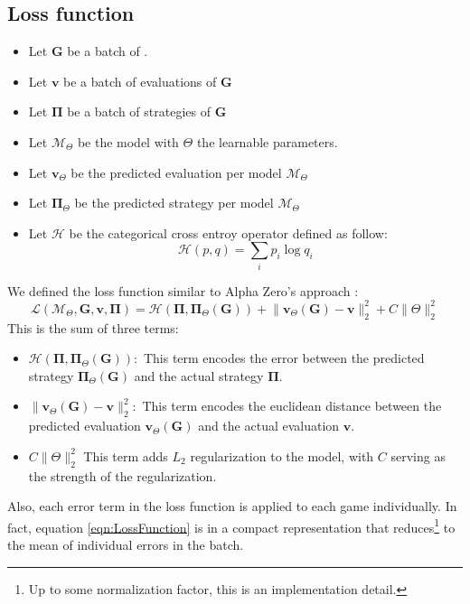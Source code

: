 \subsection{Loss function}
\begin{itemize}
	\item Let $\boldsymbol{G}$ be a batch of .
	\item Let $\boldsymbol{v}$ be a batch of evaluations of $\boldsymbol{G}$ 
	\item Let $\boldsymbol{\Pi}$ be a batch of strategies of $\boldsymbol{G}$
	\item Let $\mathcal{M}_{\Theta}$ be the model with $\Theta$ the learnable parameters.
	\item Let $\boldsymbol{v}_{\Theta}$ be the predicted evaluation per model $\mathcal{M}_{\Theta}$
	\item Let $\boldsymbol{\Pi}_{\Theta}$ be the predicted strategy per model $\mathcal{M}_{\Theta}$ 
	\item Let $\mathcal{H}$ be the categorical cross entroy operator defined as follow:
	\begin{equation*}
		\mathcal{H}(p,q) = \sum_{i}p_i \log q_i 
	\end{equation*}
\end{itemize}
We defined the loss function similar to Alpha Zero's approach \cite{AlphaZero}:
\begin{equation}
	\label{eqn:LossFunction}
	\mathcal{L}(\mathcal{M}_{\Theta},\boldsymbol{G},\boldsymbol{v},\boldsymbol{\Pi}) = \mathcal{H}(\boldsymbol{\Pi},\boldsymbol{\Pi}_\Theta(\boldsymbol{G})) + \lVert \boldsymbol{v}_{\Theta}(\boldsymbol{G})- \boldsymbol{v} \rVert_2^2 +  C \lVert \Theta \rVert_2^2
\end{equation}
This is the sum of three terms:
\begin{itemize}
	\item $\displaystyle \mathcal{H}(\boldsymbol{\Pi},\boldsymbol{\Pi}_\Theta(\boldsymbol{G})):$ This term encodes the error between the predicted strategy $\boldsymbol{\Pi}_\Theta(\boldsymbol{G})$ and the actual strategy $\boldsymbol{\Pi}$.
	\item $\displaystyle \lVert \boldsymbol{v}_{\Theta}(\boldsymbol{G})- \boldsymbol{v} \rVert_2^2:$ This term encodes the euclidean distance between the predicted evaluation $\boldsymbol{v}_{\Theta}(\boldsymbol{G})$ and the actual evaluation $\boldsymbol{v}$.
	\item $\displaystyle C \lVert \Theta \rVert_2^2$ This term adds $L_2$ regularization to the model, with $C$ serving as the strength of the regularization.
\end{itemize}
Also, each error term in the loss function is applied to each game individually. In fact, equation \eqref{eqn:LossFunction} is in a compact representation that reduces\footnote{Up to some normalization factor, this is an implementation detail.} to the mean of individual errors in the batch.
